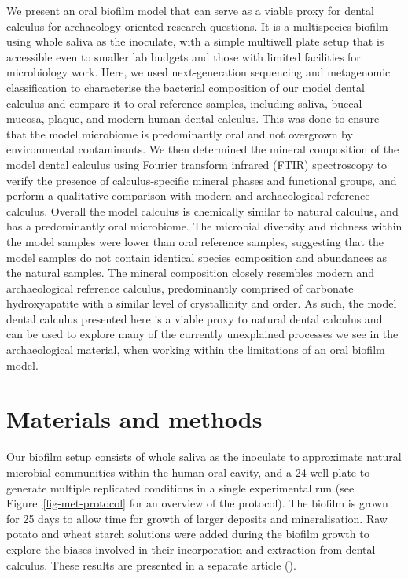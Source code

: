 \documentclass[
  b5paper,
]{book}
\begin{document}
We present an oral biofilm model that can serve as a viable proxy for
dental calculus for archaeology-oriented research questions. It is a
multispecies biofilm using whole saliva as the inoculate, with a simple
multiwell plate setup that is accessible even to smaller lab budgets and
those with limited facilities for microbiology work. Here, we used
next-generation sequencing and metagenomic classification to
characterise the bacterial composition of our model dental calculus and
compare it to oral reference samples, including saliva, buccal mucosa,
plaque, and modern human dental calculus. This was done to ensure that
the model microbiome is predominantly oral and not overgrown by
environmental contaminants. We then determined the mineral composition
of the model dental calculus using Fourier transform infrared (FTIR)
spectroscopy to verify the presence of calculus-specific mineral phases
and functional groups, and perform a qualitative comparison with modern
and archaeological reference calculus. Overall the model calculus is
chemically similar to natural calculus, and has a predominantly oral
microbiome. The microbial diversity and richness within the model
samples were lower than oral reference samples, suggesting that the
model samples do not contain identical species composition and
abundances as the natural samples. The mineral composition closely
resembles modern and archaeological reference calculus, predominantly
comprised of carbonate hydroxyapatite with a similar level of
crystallinity and order. As such, the model dental calculus presented
here is a viable proxy to natural dental calculus and can be used to
explore many of the currently unexplained processes we see in the
archaeological material, when working within the limitations of an oral
biofilm model.

\section{Materials and methods}\label{materials-and-methods}

Our biofilm setup consists of whole saliva as the inoculate to
approximate natural microbial communities within the human oral cavity,
and a 24-well plate to generate multiple replicated conditions in a
single experimental run (see Figure~\ref{fig-met-protocol} for an
overview of the protocol). The biofilm is grown for 25 days to allow
time for growth of larger deposits and mineralisation. Raw potato and
wheat starch solutions were added during the biofilm growth to explore
the biases involved in their incorporation and extraction from dental
calculus. These results are presented in a separate article
().
\end{document}
